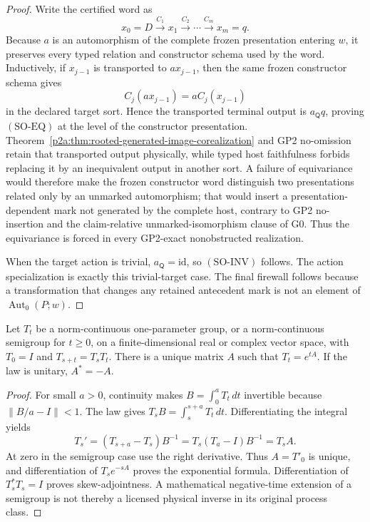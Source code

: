 \documentclass[12pt,a4paper]{article}
\begin{document}
\begin{proof}
Write the certified word as
\[
 x_0=D\xrightarrow{C_1}x_1\xrightarrow{C_2}\cdots
 \xrightarrow{C_m}x_m=q.
\]
Because \(a\) is an automorphism of the complete frozen presentation entering
\(w\), it preserves every typed relation and constructor schema used by the
word.  Inductively, if \(x_{j-1}\) is transported to \(a x_{j-1}\), then the
same frozen constructor schema gives
\[
 C_j(a x_{j-1})=a C_j(x_{j-1})
\]
in the declared target sort.  Hence the transported terminal output is
\(a_{\mathsf Q}q\), proving \((\mathrm{SO\text{-}EQ})\) at the level of the
constructor presentation.  Theorem~\ref{p2a:thm:rooted-generated-image-corealization}
and GP2 no-omission retain that transported output physically, while typed
host faithfulness forbids replacing it by an inequivalent output in another
sort.  A failure of equivariance would therefore make the frozen constructor
word distinguish two presentations related only by an unmarked automorphism;
that would insert a presentation-dependent mark not generated by the complete
host, contrary to GP2 no-insertion and the claim-relative unmarked-isomorphism
clause of G0.  Thus the equivariance is forced in every GP2-exact
nonobstructed realization.

When the target action is trivial, \(a_{\mathsf Q}=\mathrm{id}\), so
\((\mathrm{SO\text{-}INV})\) follows.  The action specialization is exactly
this trivial-target case.  The final firewall follows because a transformation
that changes any retained antecedent mark is not an element of
\(\operatorname{Aut}_0(P;w)\).
\end{proof}

\begin{lemma}
\label{p2a:lem:repair-finite-generator-regularity}
Let $T_t$ be a norm-continuous one-parameter group, or a norm-continuous
semigroup for $t\ge0$, on a finite-dimensional real or complex vector space,
with $T_0=I$ and $T_{s+t}=T_sT_t$. There is a unique matrix $A$ such that
$T_t=e^{tA}$. If the law is unitary, $A^*=-A$.
\end{lemma}
\begin{proof}
For small $a>0$, continuity makes
$B=\int_0^aT_t\,dt$ invertible because $\|B/a-I\|<1$.
The law gives $T_sB=\int_s^{s+a}T_t\,dt$. Differentiating the integral yields
\[
 T_s'=(T_{s+a}-T_s)B^{-1}
     =T_s(T_a-I)B^{-1}=T_sA.
\]
At zero in the semigroup case use the right derivative. Thus $A=T'_0$ is
unique, and differentiation of $T_se^{-sA}$ proves the exponential formula.
Differentiation of $T_s^*T_s=I$ proves skew-adjointness. A mathematical
negative-time extension of a semigroup is not thereby a licensed physical
inverse in its original process class.
\end{proof}
\end{document}
